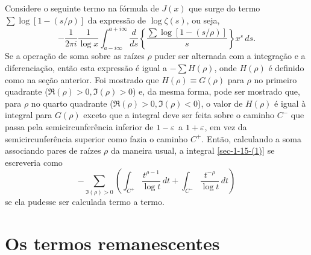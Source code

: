     
    Considere o seguinte termo na fórmula de $J(x)$ que surge do termo $\sum \log [1 - (s/\rho)]$ da expressão de $\log \zeta(s)$, ou seja, 
    \begin{equation}
        \label{sec-1-15-(1)}
        -\frac{1}{2 \pi i} \frac{1}{\log x} \int_{a - i\infty}^{a + i\infty} \frac{d}{ds} \left\{ \frac{\sum \log [1 - (s/\rho)]}{s} \right\} x^s \, ds.
    \end{equation}
    Se a operação de soma sobre as raízes $\rho$ puder ser alternada com a integração e a diferenciação, então esta expressão é igual a $-\sum H(\rho)$, onde $H(\rho)$ é definido como na seção anterior. Foi mostrado que $H(\rho) \equiv G(\rho)$ para $\rho$ no primeiro quadrante ($\Re(\rho) > 0, \Im(\rho) > 0$) e, da mesma forma, pode ser mostrado que, para $\rho$ no quarto quadrante ($\Re(\rho) > 0, \Im(\rho) < 0$), o valor de $H(\rho)$ é igual à integral para $G(\rho)$ exceto que a integral deve ser feita sobre o caminho $C^{-}$ que passa pela semicircunferência inferior de $1 - \varepsilon$ a $1 + \varepsilon$, em vez da semicircunferência superior como fazia o caminho $C^{+}$. Então, calculando a soma associando pares de raízes $\rho$ da maneira usual, a integral \eqref{sec-1-15-(1)} se escreveria como
    \begin{equation}
        \label{sec-1-15-(2)}
        -\sum_{\Im(\rho) > 0} \left( \int_{C^+} \frac{t^{\rho -1}}{\log t} \, dt + \int_{C^{-}} \frac{t^{-\rho}}{\log t} \, dt \right)
    \end{equation}
    se ela pudesse ser calculada termo a termo.
    
    
    
    
    
    
    \section{Os termos remanescentes} \label{sec-1-16}
    
    
    
    
    
    
    
    
    
    
    
    
    
    
    
    













